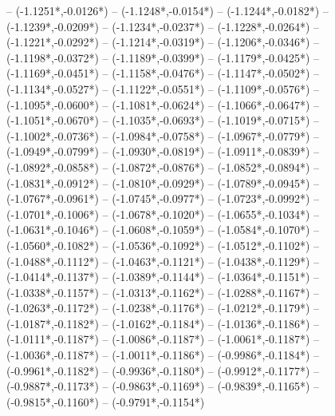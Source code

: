 {	-- ({-1.1251*\dx},{-0.0126*\dy})
	-- ({-1.1248*\dx},{-0.0154*\dy})
	-- ({-1.1244*\dx},{-0.0182*\dy})
	-- ({-1.1239*\dx},{-0.0209*\dy})
	-- ({-1.1234*\dx},{-0.0237*\dy})
	-- ({-1.1228*\dx},{-0.0264*\dy})
	-- ({-1.1221*\dx},{-0.0292*\dy})
	-- ({-1.1214*\dx},{-0.0319*\dy})
	-- ({-1.1206*\dx},{-0.0346*\dy})
	-- ({-1.1198*\dx},{-0.0372*\dy})
	-- ({-1.1189*\dx},{-0.0399*\dy})
	-- ({-1.1179*\dx},{-0.0425*\dy})
	-- ({-1.1169*\dx},{-0.0451*\dy})
	-- ({-1.1158*\dx},{-0.0476*\dy})
	-- ({-1.1147*\dx},{-0.0502*\dy})
	-- ({-1.1134*\dx},{-0.0527*\dy})
	-- ({-1.1122*\dx},{-0.0551*\dy})
	-- ({-1.1109*\dx},{-0.0576*\dy})
	-- ({-1.1095*\dx},{-0.0600*\dy})
	-- ({-1.1081*\dx},{-0.0624*\dy})
	-- ({-1.1066*\dx},{-0.0647*\dy})
	-- ({-1.1051*\dx},{-0.0670*\dy})
	-- ({-1.1035*\dx},{-0.0693*\dy})
	-- ({-1.1019*\dx},{-0.0715*\dy})
	-- ({-1.1002*\dx},{-0.0736*\dy})
	-- ({-1.0984*\dx},{-0.0758*\dy})
	-- ({-1.0967*\dx},{-0.0779*\dy})
	-- ({-1.0949*\dx},{-0.0799*\dy})
	-- ({-1.0930*\dx},{-0.0819*\dy})
	-- ({-1.0911*\dx},{-0.0839*\dy})
	-- ({-1.0892*\dx},{-0.0858*\dy})
	-- ({-1.0872*\dx},{-0.0876*\dy})
	-- ({-1.0852*\dx},{-0.0894*\dy})
	-- ({-1.0831*\dx},{-0.0912*\dy})
	-- ({-1.0810*\dx},{-0.0929*\dy})
	-- ({-1.0789*\dx},{-0.0945*\dy})
	-- ({-1.0767*\dx},{-0.0961*\dy})
	-- ({-1.0745*\dx},{-0.0977*\dy})
	-- ({-1.0723*\dx},{-0.0992*\dy})
	-- ({-1.0701*\dx},{-0.1006*\dy})
	-- ({-1.0678*\dx},{-0.1020*\dy})
	-- ({-1.0655*\dx},{-0.1034*\dy})
	-- ({-1.0631*\dx},{-0.1046*\dy})
	-- ({-1.0608*\dx},{-0.1059*\dy})
	-- ({-1.0584*\dx},{-0.1070*\dy})
	-- ({-1.0560*\dx},{-0.1082*\dy})
	-- ({-1.0536*\dx},{-0.1092*\dy})
	-- ({-1.0512*\dx},{-0.1102*\dy})
	-- ({-1.0488*\dx},{-0.1112*\dy})
	-- ({-1.0463*\dx},{-0.1121*\dy})
	-- ({-1.0438*\dx},{-0.1129*\dy})
	-- ({-1.0414*\dx},{-0.1137*\dy})
	-- ({-1.0389*\dx},{-0.1144*\dy})
	-- ({-1.0364*\dx},{-0.1151*\dy})
	-- ({-1.0338*\dx},{-0.1157*\dy})
	-- ({-1.0313*\dx},{-0.1162*\dy})
	-- ({-1.0288*\dx},{-0.1167*\dy})
	-- ({-1.0263*\dx},{-0.1172*\dy})
	-- ({-1.0238*\dx},{-0.1176*\dy})
	-- ({-1.0212*\dx},{-0.1179*\dy})
	-- ({-1.0187*\dx},{-0.1182*\dy})
	-- ({-1.0162*\dx},{-0.1184*\dy})
	-- ({-1.0136*\dx},{-0.1186*\dy})
	-- ({-1.0111*\dx},{-0.1187*\dy})
	-- ({-1.0086*\dx},{-0.1187*\dy})
	-- ({-1.0061*\dx},{-0.1187*\dy})
	-- ({-1.0036*\dx},{-0.1187*\dy})
	-- ({-1.0011*\dx},{-0.1186*\dy})
	-- ({-0.9986*\dx},{-0.1184*\dy})
	-- ({-0.9961*\dx},{-0.1182*\dy})
	-- ({-0.9936*\dx},{-0.1180*\dy})
	-- ({-0.9912*\dx},{-0.1177*\dy})
	-- ({-0.9887*\dx},{-0.1173*\dy})
	-- ({-0.9863*\dx},{-0.1169*\dy})
	-- ({-0.9839*\dx},{-0.1165*\dy})
	-- ({-0.9815*\dx},{-0.1160*\dy})
	-- ({-0.9791*\dx},{-0.1154*\dy})
}
